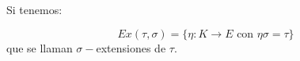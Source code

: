 \begin{definicion}
    Si tenemos:
    \begin{figure}[H]
        \centering
    \end{figure}
    \begin{equation*}
        Ex(\tau,\sigma) = \{\eta:K\to E \text{\ con\ } \eta \sigma = \tau\}
    \end{equation*}
    que se llaman $\sigma-$extensiones de $\tau$.
\end{definicion}

